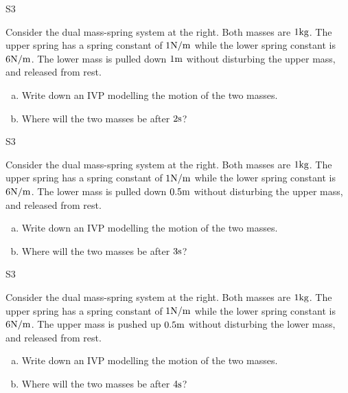 \begin{problem}{S3}
\begin{minipage}[t]{0.8\linewidth}
Consider the dual mass-spring system at the right.  Both masses are \(1 {\rm kg}\).  The upper spring has a spring constant of \( 1 {\rm N/m}\) while the lower spring constant is \(6 {\rm N/m}\).  The lower mass is pulled down \(1 {\rm m}\) without disturbing the upper mass, and released from rest. 
\begin{enumerate}[(a)]
\item Write down an IVP modelling the motion of the two masses.
\item Where will the two masses be after \(2 {\rm s}\)?
\end{enumerate}
\end{minipage}
\hfill
\springdoublemassQuiz[0.7]
\hfill
\end{problem}

\begin{problem}{S3}
\begin{minipage}[t]{0.8\linewidth}
Consider the dual mass-spring system at the right.  Both masses are \(1 {\rm kg}\).  The upper spring has a spring constant of \( 1 {\rm N/m}\) while the lower spring constant is \(6 {\rm N/m}\).  The lower mass is pulled down \(0.5 {\rm m}\) without disturbing the upper mass, and released from rest. 
\begin{enumerate}[(a)]
\item Write down an IVP modelling the motion of the two masses.
\item Where will the two masses be after \(3 {\rm s}\)?
\end{enumerate}
\end{minipage}
\hfill
\springdoublemassQuiz[0.7]
\hfill
\end{problem}

\begin{problem}{S3}
\begin{minipage}[t]{0.8\linewidth}
Consider the dual mass-spring system at the right.  Both masses are \(1 {\rm kg}\).  The upper spring has a spring constant of \( 1 {\rm N/m}\) while the lower spring constant is \(6 {\rm N/m}\).  The upper mass is pushed up \(0.5 {\rm m}\) without disturbing the lower mass, and released from rest. 
\begin{enumerate}[(a)]
\item Write down an IVP modelling the motion of the two masses.
\item Where will the two masses be after \(4 {\rm s}\)?
\end{enumerate}
\end{minipage}
\hfill
\springdoublemassQuiz[0.7]
\hfill
\end{problem}

